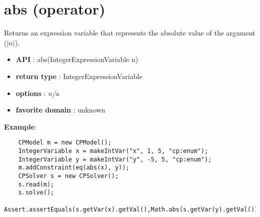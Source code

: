 \section{abs (operator)}\label{abs:absoperator}\hypertarget{abs:absoperator}{}
Returns an expression variable that represents the absolute value of the argument (\(|n|\)).

\begin{itemize}
	\item \textbf{API} : abs(IntegerExpressionVariable n)
	\item \textbf{return type} : IntegerExpressionVariable
	\item \textbf{options} : \emph{n/a}
	\item \textbf{favorite domain} : unknown
\end{itemize}

\textbf{Example}:
\begin{lstlisting}
	CPModel m = new CPModel();
	IntegerVariable x = makeIntVar("x", 1, 5, "cp:enum");
	IntegerVariable y = makeIntVar("y", -5, 5, "cp:enum");
	m.addConstraint(eq(abs(x), y));
	CPSolver s = new CPSolver();
	s.read(m);
	s.solve();
	Assert.assertEquals(s.getVar(x).getVal(),Math.abs(s.getVar(y).getVal()));
\end{lstlisting}

